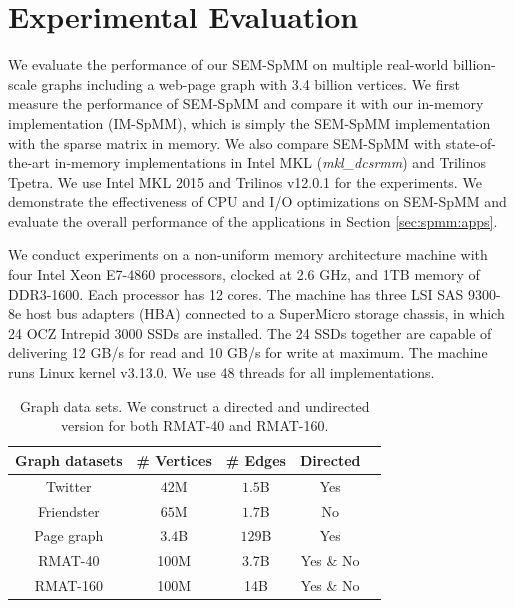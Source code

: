 \section{Experimental Evaluation}

We evaluate the performance of our SEM-SpMM on multiple real-world billion-scale
graphs including a web-page graph with 3.4 billion vertices. We first measure
the performance of SEM-SpMM and compare it with our in-memory implementation
(IM-SpMM), which is simply the SEM-SpMM implementation with the sparse matrix
in memory.
We also compare SEM-SpMM with state-of-the-art in-memory implementations in
Intel MKL (\textit{mkl\_dcsrmm}) and Trilinos Tpetra. We use Intel MKL 2015
and Trilinos v12.0.1 for the experiments. We demonstrate the effectiveness of
CPU and I/O optimizations on SEM-SpMM and evaluate the overall performance
of the applications in Section \ref{sec:spmm:apps}.

We conduct experiments on a non-uniform memory architecture machine with
four Intel Xeon E7-4860 processors, clocked at 2.6 GHz, and 1TB memory of
DDR3-1600. Each processor has 12 cores. The machine has three LSI SAS 9300-8e
host bus adapters (HBA) connected to a SuperMicro storage chassis, in which
24 OCZ Intrepid 3000 SSDs are installed. The 24 SSDs together are capable of
delivering 12 GB/s for read and 10 GB/s for write at maximum. The machine runs
Linux kernel v3.13.0. We use 48 threads for all implementations.

\begin{table}
\begin{center}
\footnotesize
\begin{tabular}{|c|c|c|c|c|}
\hline
Graph datasets & \# Vertices & \# Edges & Directed \\
\hline
Twitter \cite{twitter} & $42$M & $1.5$B & Yes \\
\hline
Friendster \cite{friendster} & $65$M & $1.7$B & No \\
\hline
Page graph \cite{web_graph} & $3.4$B & $129$B & Yes \\
\hline
RMAT-40 \cite{rmat} & 100M & 3.7B & Yes \& No \\
\hline
RMAT-160 \cite{rmat} & 100M & 14B & Yes \& No \\
\hline
\end{tabular}
\normalsize
\end{center}
\caption{Graph data sets. We construct a directed and undirected version for
both RMAT-40 and RMAT-160.}
\label{graphs}
\end{table}

